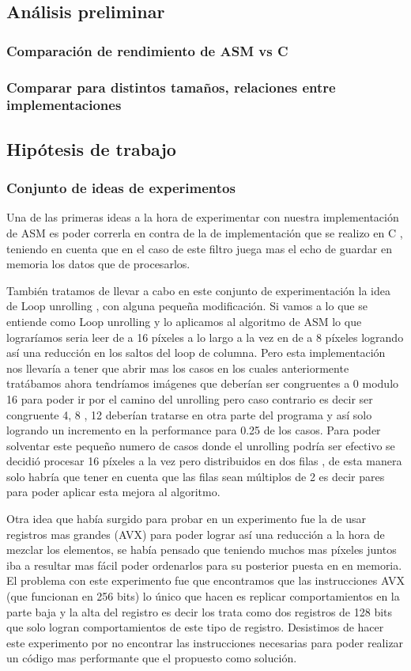 \subsection{Análisis preliminar}
\subsubsection*{Comparación de rendimiento de ASM vs C}
\subsubsection*{Comparar para distintos tamaños, relaciones entre implementaciones}

\subsection{Hipótesis de trabajo}
\subsubsection*{Conjunto de ideas de experimentos}
Una de las primeras ideas a la hora de experimentar con nuestra implementación de ASM es poder correrla en contra de la de implementación que se realizo en C , teniendo en cuenta que en el caso de este filtro juega mas el echo de guardar en memoria los datos que de procesarlos.

También tratamos de llevar a cabo en este conjunto de experimentación la idea de Loop unrolling , con alguna pequeña modificación. Si vamos a lo que se entiende como Loop unrolling y lo aplicamos al algoritmo de ASM lo que lograríamos seria leer de a 16 píxeles a lo largo a la vez en de a 8 píxeles logrando así una reducción en los saltos del loop de columna. Pero esta implementación nos llevaría a tener que abrir mas los casos en los cuales anteriormente tratábamos ahora tendríamos imágenes que deberían ser congruentes a 0 modulo 16 para poder ir por el camino del unrolling pero caso contrario es decir ser congruente 4, 8 , 12 deberían tratarse en otra parte del programa y así solo logrando un incremento en la performance para 0.25 de los casos. Para poder solventar este pequeño numero de casos donde el unrolling podría ser efectivo se decidió procesar 16 píxeles a la vez pero distribuidos en dos filas , de esta manera solo habría que tener en cuenta que las filas sean múltiplos de 2 es decir pares para poder aplicar esta mejora al algoritmo.

Otra idea que había surgido para probar en un experimento fue la de usar registros mas grandes (AVX) para poder lograr así una reducción a la hora de mezclar los elementos, se había pensado que teniendo muchos mas píxeles juntos iba a resultar mas fácil poder ordenarlos para su posterior puesta en en memoria. El problema con este experimento fue que encontramos que las instrucciones AVX (que funcionan en 256 bits) lo único que hacen es replicar comportamientos en la parte baja y la alta del registro es decir los trata como dos registros de 128 bits que solo logran comportamientos de este tipo de registro. Desistimos de hacer este experimento por no encontrar las instrucciones necesarias para poder realizar un código mas performante que el propuesto como solución. 

